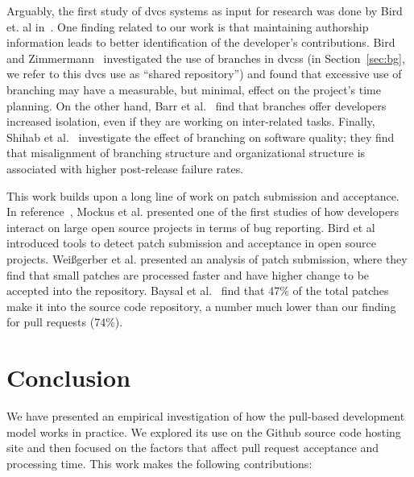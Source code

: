 \documentclass{sig-alternate}
\begin{document}
Arguably, the first study of {\sc dvcs} systems as input for research was done
by Bird et. al in~\cite{Bird09}. One finding related to our work is that
maintaining authorship information leads to better identification of the
developer's contributions. Bird and Zimmermann~\cite{Bird12} investigated the
use of branches in {\sc dvcs}s (in Section~\ref{sec:bg}, we refer to this {\sc
dvcs} use as ``shared repository'') and found that excessive use of branching
may have a measurable, but minimal, effect on the project's time planning.
On the other hand, Barr et al.~\cite{Barr12} find that branches offer developers
increased isolation, even if they are working on inter-related tasks.
Finally, Shihab et al.~\cite{Shiha12} investigate the effect of branching on
software quality; they find that misalignment of branching structure and organizational structure is associated with higher post-release failure rates.

This work builds upon a long line of work on patch submission and acceptance.
In reference~\cite{MOCKU02}, Mockus et al. presented one of the first studies of
how developers interact on large open source projects in terms of bug reporting.
Bird et al~\cite{Bird07a} introduced tools to detect patch submission and
acceptance in open source projects. Wei\ss gerber et al. presented an analysis
of patch submission, where they find that small patches are processed faster and
have higher change to be accepted into the repository. Baysal et
al.~\cite{Baysa12} find that 47\% of the total patches make it into the source
code repository, a number much lower than our finding for pull requests (74\%).

\section{Conclusion}

We have presented an empirical investigation of how the pull-based development
model works in practice. We explored its use on the Github source code
hosting site and then focused on the factors that affect pull request acceptance
and processing time. This work makes the following contributions:
\end{document}
